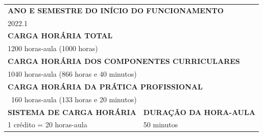 \documentclass[
	12pt,				%
	openright,			%
	twoside,			%
	a4paper,			%
	chapter=TITLE,		%
	english,			%
	french,				%
	spanish,			%
	brazil,				%
	]{abntex2}
\begin{document}
\begin{tabularx}{\linewidth}{X X X X X X}
    
    \multicolumn{6}{l}{\cellcolor{gray!20}\textbf{ANO E SEMESTRE DO INÍCIO DO FUNCIONAMENTO}} \\
    
    \multicolumn{6}{l}{2022.1} \\
    
        \multicolumn{6}{l}{\cellcolor{gray!20}\textbf{CARGA HORÁRIA TOTAL}} \\
    
    \multicolumn{6}{l}{1200 horas-aula (1000 horas)} \\

    
    
    \multicolumn{6}{l}{\cellcolor{gray!20}\textbf{CARGA HORÁRIA DOS COMPONENTES CURRICULARES}} \\
    
    \multicolumn{6}{l}{1040 horas-aula (866 horas e 40 minutos)} \\
    
    
    
    
    
     
    \multicolumn{6}{l}{\cellcolor{gray!20}\textbf{CARGA HORÁRIA DA PRÁTICA PROFISSIONAL}} \\
    
    \multicolumn{6}{l}{~160 horas-aula (133 horas e 20 minutos)} \\
    
    
    \multicolumn{3}{l}{\cellcolor{gray!20}\textbf{SISTEMA DE CARGA HORÁRIA}} & \multicolumn{3}{l}{\cellcolor{gray!20}\textbf{DURAÇÃO DA HORA-AULA}} \\ 
    
    \multicolumn{3}{l}{1 crédito = 20 horas-aula} & \multicolumn{3}{l}{50 minutos} \\
    
    
    \bottomrule
    
    
    
    
    

\end{tabularx}
\end{document}
